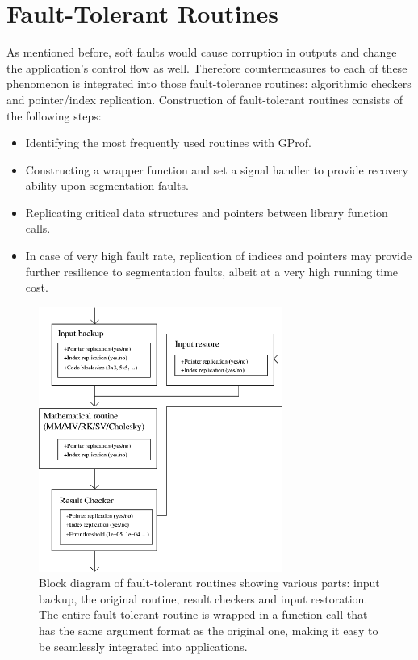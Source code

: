 \documentclass{article}
\begin{document}
\section{Fault-Tolerant Routines}

As mentioned before, soft faults would cause corruption in outputs and change the application's control flow as well. Therefore countermeasures to each of these phenomenon is integrated into those fault-tolerance routines: algorithmic checkers and pointer/index replication. Construction of fault-tolerant routines consists of the following steps:

\begin{itemize}
\item{Identifying the most frequently used routines with GProf.}
\item{Constructing a wrapper function and set a signal handler to provide recovery ability upon segmentation faults.}
\item{Replicating critical data structures and pointers between library function calls.}
\item{In case of very high fault rate, replication of indices and pointers may provide further resilience to segmentation faults, albeit at a very high running time cost.}
\end{itemize}


\begin{figure}
\includegraphics[width=8cm]{flow.png}
\caption{Block diagram of fault-tolerant routines showing various parts: input backup, the original routine, result checkers and input restoration. The entire fault-tolerant routine is wrapped in a function call that has the same argument format as the original one, making it easy to be seamlessly integrated into applications.}
\label{faultRoutinesBlockDiagram}
\end{figure}
\end{document}
